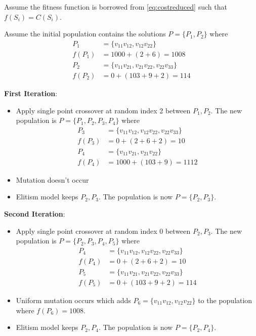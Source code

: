 \documentclass[conference]{IEEEtran}
\begin{document}
Assume the fitness function is borrowed from \ref{eq:costreduced} such that $f(S_i) = C(S_i)$.

Assume the initial population contains the solutions $P = \{ P_1, P_2 \}$ where
\begin{align*}
P_1 &= \{ v_{11}v_{12}, v_{12}v_{22} \} \\
f(P_1) &= 1000 + (2 + 6) = 1008 \\
P_2 &= \{ v_{11}v_{21}, v_{21}v_{22}, v_{22}v_{33} \} \\
f(P_2) &= 0 + (103 + 9 + 2) = 114
\end{align*}

\textbf{First Iteration}:
\begin{itemize}
\item Apply single point crossover at random index 2 between $P_1, P_2$. The new population is $P = \{ P_1, P_2, P_3, P_4 \}$ where
\begin{align*}
P_3 &= \{ v_{11}v_{12}, v_{12}v_{22}, v_{22}v_{33} \} \\
f(P_3) &= 0 + (2 + 6 + 2) = 10 \\
P_4 &= \{ v_{11}v_{21}, v_{21}v_{22} \} \\
f(P_4) &= 1000 + (103 + 9) = 1112
\end{align*}

\item Mutation doesn't occur

\item Elitism model keeps $P_2, P_3$. The population is now $P = \{ P_2, P_3 \}$.
\end{itemize}

\textbf{Second Iteration}:
\begin{itemize}
\item Apply single point crossover at random index 0 between $P_2, P_3$. The new population is $P = \{ P_2, P_3, P_4, P_5 \}$ where
\begin{align*}
P_4 &= \{ v_{11}v_{12}, v_{12}v_{22}, v_{22}v_{33} \} \\
f(P_4) &= 0 + (2 + 6 + 2) = 10 \\
P_5 &= \{ v_{11}v_{21}, v_{21}v_{22}, v_{22}v_{33} \} \\
f(P_5) &= 0 + (103 + 9 + 2) = 114
\end{align*}

\item Uniform mutation occurs which adds $P_6 = \{ v_{11}v_{12}, v_{12}v_{22} \}$ to the population where $f(P_6) = 1008$.

\item Elitism model keeps $P_2, P_4$. The population is now $P = \{ P_2, P_4 \}$.
\end{itemize}
\end{document}
